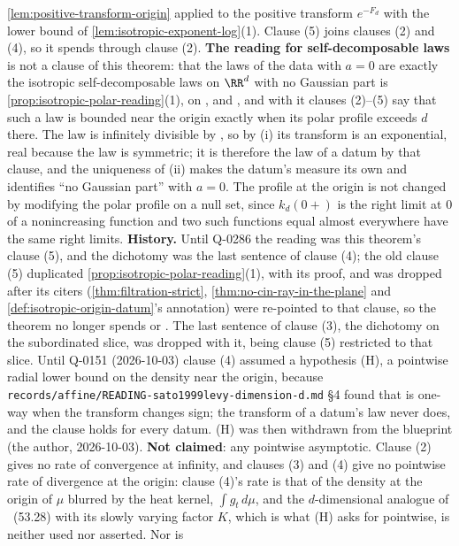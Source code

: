 \begin{theorem}
{\ref{lem:positive-transform-origin} applied to the positive transform $e^{-F_d}$ with the lower
bound of \ref{lem:isotropic-exponent-log}(1). Clause (5) joins clauses (2) and (4), so it spends
 through clause (2). \textbf{The reading for self-decomposable laws} is not a clause of
this theorem: that the laws of the data with $a = 0$ are exactly the isotropic self-decomposable
laws on $\RR^d$ with no Gaussian part is \ref{prop:isotropic-polar-reading}(1), on ,
 and , and with it clauses (2)--(5) say that such a law is bounded near the
origin exactly when its polar profile exceeds $d$ there. The law is
infinitely divisible by , so by (i) its transform is an exponential, real
because the law is symmetric; it is therefore the law of a datum by that clause,
and the uniqueness of (ii) makes the datum's \Levy{} measure its own and identifies
``no Gaussian part'' with $a = 0$. The profile at the origin is not changed by modifying the polar
profile on a null set, since $k_d(0{+})$ is the right limit at $0$ of a nonincreasing function and two
such functions equal almost everywhere have the same right limits. \textbf{History.} Until Q-0286 the
reading was this theorem's clause (5), and the dichotomy was the last sentence of clause (4); the
old clause (5) duplicated \ref{prop:isotropic-polar-reading}(1), with its proof, and was dropped
after its citers (\ref{thm:filtration-strict}, \ref{thm:no-cin-ray-in-the-plane} and
\ref{def:isotropic-origin-datum}'s annotation) were re-pointed to that clause, so the theorem no
longer spends  or . The last sentence of clause (3), the dichotomy on the
subordinated slice, was dropped with it, being clause (5) restricted to that slice. Until Q-0151
(2026-10-03) clause (4) assumed a hypothesis (H), a pointwise radial lower bound on the density
near the origin, because \texttt{records/affine/READING-sato1999levy-dimension-d.md} \S 4 found
that  is one-way when the transform changes sign; the transform of a datum's law never
does, and the clause holds for every datum. (H) was then withdrawn from the blueprint (the author,
2026-10-03). \textbf{Not claimed}: any pointwise asymptotic. Clause (2) gives no rate of
convergence at infinity, and clauses (3) and (4) give no pointwise rate of divergence at the
origin: clause (4)'s rate is that of the density at the origin of $\mu$ blurred by the heat kernel,
$\int g_t\,d\mu$, and the $d$-dimensional analogue of ~(53.28) with its slowly
varying factor $K$, which is what (H) asks for pointwise, is neither used nor asserted. Nor is
}
\end{theorem}
